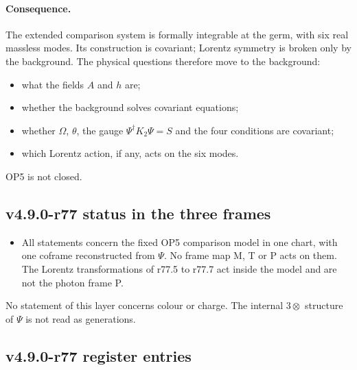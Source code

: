 \paragraph{Consequence.}
The extended comparison system is formally integrable at the germ, with six real massless modes.  Its construction is
covariant; Lorentz symmetry is broken only by the background.  The physical questions therefore move to the background:
\begin{itemize}[leftmargin=2em]
\item what the fields \(A\) and \(h\) are;
\item whether the background solves covariant equations;
\item whether \(\Omega\), \(\theta\), the gauge \(\Psi^\dagger K_2\Psi=S\) and the four conditions are covariant;
\item which Lorentz action, if any, acts on the six modes.
\end{itemize}
OP5 is not closed.

\subsection*{v4.9.0-r77 status in the three frames}
\label{subsec:v490-r77-frames}

\begin{itemize}[leftmargin=2em]
\item All statements concern the fixed OP5 comparison model in one chart, with one coframe reconstructed from \(\Psi\).  No
frame map M, T or P acts on them.  The Lorentz transformations of r77.5 to r77.7 act inside the model and are not the photon
frame P.
\end{itemize}
No statement of this layer concerns colour or charge.  The internal \(3\otimes\) structure of \(\Psi\) is not read as
generations.

\subsection*{v4.9.0-r77 register entries}
\label{subsec:v490-r77-register}

